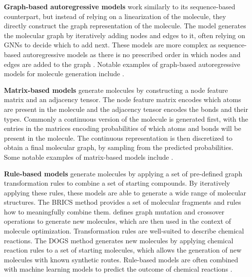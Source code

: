 \textbf{Graph-based autoregressive models} work similarly to its sequence-based counterpart, but
instead of relying on a linearization of the molecule, they directly construct the graph
representation of the molecule. The model generates the molecular graph by iteratively adding nodes
and edges to it, often relying on \acp{GNN} to decide which to add next. These models are more
complex as sequence-based autoregressive models as there is no prescribed order in which nodes and
edges are added to the graph \citep{hanFittingAutoregressiveGraph2023}. Notable examples of
graph-based autoregressive models for molecule generation include
\citep{liuConstrainedGraphVariational2018,liLearningDeepGenerative2018,youGraphConvolutionalPolicy2019,cohen-karlikOvercomingOrderAutoregressive2024}.

\textbf{Matrix-based models}  generate molecules by constructing a node feature matrix and an
adjacency tensor. The node feature matrix encodes which atoms are present in the molecule and the
adjacency tensor encodes the bonds and their types. Commonly a continuous version of the molecule is
generated first, with the entries in the matrices encoding probabilities of which atoms and bonds
will be present in the molecule. The continuous representation is then discretized to obtain a final
molecular graph, by sampling from the predicted probabilities. Some notable examples of
matrix-based models include \citep{simonovskyGraphVAEGenerationSmall2018,decaoMolGANImplicitGenerative2018,madhawaGraphNVPInvertibleFlow2019}.

\textbf{Rule-based models} generate molecules by applying a set of pre-defined graph transformation
rules to combine a set of starting compounds. By iteratively applying these rules, these models are
able to generate a wide range of molecular structures. The BRICS \citep{degenArtCompilingUsing2008}
method provides a set of molecular fragments and rules how to meaningfully combine them.
\citet{jensenGraphbasedGeneticAlgorithm2019} defines graph mutation and crossover operations to
generate new molecules, which are then used in the context of molecule optimization.
Transformation rules are well-suited to describe chemical reactions. The DOGS method
\citep{hartenfellerDOGSReactionDrivenNovo2012} generates new molecules by applying chemical reaction
rules to a set of starting molecules, which allows the generation of new molecules with known
synthetic routes. Rule-based models are often combined with machine learning models to predict the
outcome of chemical reactions
\citep{seglerNeuralSymbolicMachineLearning2017,seglerPlanningChemicalSyntheses2018,fortunatoDataAugmentationPretraining2020,daiRetrosynthesisPredictionConditional2020}.


